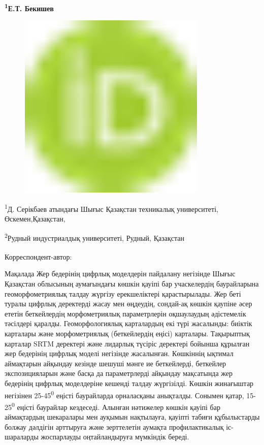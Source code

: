 {\bfseries \textsuperscript{1}Е.Т.
Бекишев}
\begin{figure}[H]
	\centering
	\includegraphics[width=0.8\textwidth]{media/ict2/image1}
	\caption*{}
\end{figure}


\textsuperscript{1}Д. Серікбаев атындағы Шығыс Қазақстан техникалық
университеті, Өскемен,Қазақстан,

\textsuperscript{2}Рудный индустриалдық университеті, Рудный, Қазақстан

{\bfseries \textsuperscript{\envelope }}Корреспондент-автор:
\href{mailto:MRahymberdina@edu.ektu.kz}{}

Мақалада Жер бедерінің цифрлық моделдерін пайдалану негізінде Шығыс
Қазақстан облысының аумағындағы көшкін қауіпі бар учаскелердің
баурайларына геоморфометриялық талдау жүргізу ерекшеліктері
қарастырылады. Жер беті туралы цифрлық деректерді жасау мен өңдеудің,
сондай-ақ көшкін қаупіне әсер ететін беткейлердің морфометриялық
параметрлерін оқшаулаудың әдістемелік тәсілдері қаралды.
Геоморфологиялық карталардың екі түрі жасалынды: биіктік карталары және
морфометриялық (беткейлердің еңісі) карталары. Тақырыптық карталар SRTM
деректері және лидарлық түсіріс деректері бойынша құрылған жер бедерінің
цифрлық моделі негізінде жасалынған. Көшкіннің ықтимал аймақтарын
айқындау кезінде шешуші мәнге ие беткейлерді, беткейлер экспозицияларын
және басқа да параметрлерді айқындау мақсатында жер бедерінің цифрлық
моделдеріне кешенді талдау жүргізілді. Көшкін жинағыштар негізінен
25-45\textsuperscript{0} еңісті баурайларда орналасқаны анықталды.
Сонымен қатар, 15-25\textsuperscript{0} еңісті баурайлар кездеседі.
Алынған нәтижелер көшкін қауіпі бар аймақтардың шекаралары мен ауқымын
нақтылауға, қауіпті табиғи құбылыстарды болжау дәлдігін арттыруға және
зерттелетін аумақта профилактикалық іс-шараларды жоспарлауды
оңтайландыруға мүмкіндік береді.

